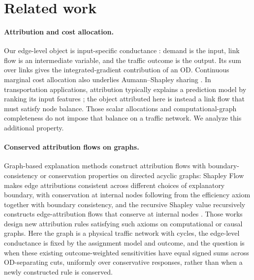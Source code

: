 \documentclass[a4paper,fleqn]{cas-sc}
\begin{document}
\section{Related work}\label{sec:related}
\paragraph{Attribution and cost allocation.}
Our edge-level object is input-specific conductance
\citep{dhamdhere2019important,lundstrom2022rigorous}: demand is the input,
link flow is an intermediate variable, and the traffic outcome is the output.
Its sum over links gives the integrated-gradient contribution of an OD.
Continuous marginal cost allocation also underlies Aumann--Shapley sharing
\citep{aumann1974values,billera1978internal}. In transportation
applications, attribution typically explains a prediction model by ranking
its input features \citep{sariyer2024leveraging,guo2024towards}; the object
attributed here is instead a link flow that must satisfy node balance.
Those scalar allocations and computational-graph completeness do not impose
that balance on a traffic network. We analyze this additional property.

\paragraph{Conserved attribution flows on graphs.}
Graph-based explanation methods construct attribution flows with
boundary-consistency or conservation properties on directed acyclic
graphs: Shapley Flow makes edge attributions consistent across
different choices of explanatory boundary, with conservation at
internal nodes following from the efficiency axiom together with
boundary consistency, and the recursive
Shapley value recursively constructs edge-attribution flows that
conserve at internal nodes \citep{wang2021shapleyflow,singal2021rsv}.
Those works design
new attribution rules satisfying such axioms on computational or causal
graphs. Here the graph is a physical traffic network with cycles, the
edge-level conductance is fixed by the assignment model and outcome,
and the question is when these existing outcome-weighted sensitivities
have equal signed sums across OD-separating cuts, uniformly over
conservative responses, rather than when a newly constructed rule is
conserved.
\end{document}
